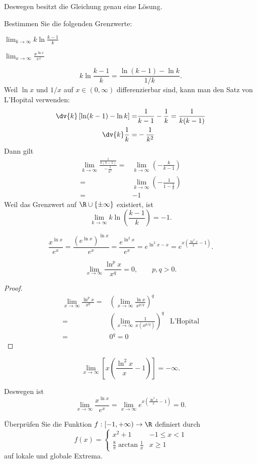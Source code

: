 Deswegen besitzt die Gleichung genau eine L\"{o}sung.

\begin{Problem}
	Bestimmen Sie die folgenden Grenzwerte:
	\begin{parts}
	\item $\lim_{k \to \infty} k\ln \frac{k-1}{k}$ 
	\item  $\lim_{x \to \infty} \frac{x^{\ln x}}{e^x}$
	\end{parts}
\end{Problem}

\begin{parts}
\item \[
k\ln \frac{k-1}{k}=\frac{\ln (k-1)-\ln k}{1 / k}
.\] 
Weil $\ln x$ und $1 / x$ auf $x\in (0,\infty)$ differenzierbar sind, kann man den Satz von L'Hopital verwenden:
\begin{align*}
	\dv{k}\left[ \ln(k-1)-\ln k \right] =& \frac{1}{k-1}-\frac{1}{k}=\frac{1}{k(k-1)}\\
	\dv{k}\frac{1}{k}=&-\frac{1}{k^2}
\end{align*}
Dann gilt
\begin{align*}
	\lim_{k \to \infty}  \frac{\frac{1}{k(k-1)}}{-\frac{1}{k^2}}=&\lim_{k \to \infty} \left( -\frac{k}{k-1} \right)\\
	=& \lim_{k \to \infty} \left( -\frac{1}{1-\frac{1}{k}} \right) \\
	=&-1
\end{align*}
Weil das Grenzwert auf $\R\cup \left\{ \pm\infty \right\} $ existiert, ist
\[
\lim_{k \to \infty} k\ln\left( \frac{k-1}{k} \right) =-1
.\]
\item \[
		\frac{x^{\ln x}}{e^x}=\frac{\left( e^{\ln x} \right)^{\ln x}}{e^x}=\frac{e^{\ln^2 x}}{e^x}=e^{\ln^2 x-x}=e^{x\left( \frac{\ln^2 x}{x}-1 \right) }
.\]
\begin{Lemma}
	\[
	\lim_{x \to \infty} \frac{\ln^p x}{x^q}=0,\qquad p,q>0
	.\] 
\end{Lemma}
\begin{proof}
	\begin{align*}
		\lim_{x \to \infty} \frac{\ln^p x}{x^q}=&\left( \lim_{x \to \infty} \frac{\ln x}{x^{p / q}} \right)^q\\
		=&\left( \lim_{x \to \infty} \frac{1}{x(x^{p / q})} \right)^q & \text{L'Hopital}\\
		=& 0^q=0
	\end{align*}
\end{proof}
\begin{Corollary}
	\[
	\lim_{x \to \infty} \left[ x\left( \frac{\ln^2x}{x}-1 \right)  \right] =-\infty
	.\] 
\end{Corollary}
Deswegen ist
\[
	\lim_{x \to \infty} \frac{x^{\ln x}}{e^x}=\lim_{x \to \infty} e^{x\left( \frac{\ln^2 x}{x}-1 \right) }=0
.\] 
\end{parts}
\begin{Problem}
	Überprüfen Sie die Funktion $f : [-1, +\infty) \to \R$ definiert durch
	\[
	f(x)=\begin{cases}
		x^2+1 & -1\le x < 1\\
		\frac{8}{\pi}\arctan \frac{1}{x} & x \ge 1
	\end{cases}
	\]
auf lokale und globale Extrema.
\end{Problem}

